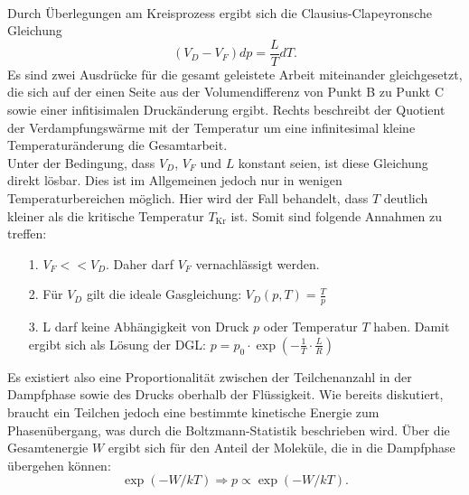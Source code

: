 \\
Durch Überlegungen am Kreisprozess ergibt sich die Clausius-Clapeyronsche Gleichung 
\begin{equation}
    (V_D-V_F)dp=\frac{L}{T}dT.
\end{equation}
Es sind zwei Ausdrücke für die gesamt geleistete Arbeit miteinander gleichgesetzt, 
die sich auf der einen Seite aus der Volumendifferenz von Punkt B zu Punkt C sowie einer infitisimalen
Druckänderung ergibt.
Rechts beschreibt der Quotient der Verdampfungswärme mit der Temperatur um eine infinitesimal kleine
Temperaturänderung die Gesamtarbeit.\\
Unter der Bedingung, dass $V_D$, $V_F$ und $L$ konstant seien, ist diese Gleichung direkt lösbar. Dies ist im
Allgemeinen jedoch nur in wenigen Temperaturbereichen möglich. Hier wird der Fall behandelt, dass $T$ deutlich kleiner
als die kritische Temperatur $T_\text{Kr}$ ist.
\newpage
Somit sind folgende Annahmen zu treffen:
\begin{itemize}
    \item[1.] $V_F<<V_D$. Daher darf $V_F$ vernachlässigt werden.
    \item[2.] Für $V_D$ gilt die ideale Gasgleichung: $V_D(p,T)=\frac{T}{p}$
    \item[3.] L darf keine Abhängigkeit von Druck $p$ oder Temperatur $T$ haben. Damit
    ergibt sich als Lösung der DGL: $p=p_0\cdot \exp(-\frac{1}{T}\cdot\frac{L}{R})$
\end{itemize}
Es existiert also eine Proportionalität zwischen der Teilchenanzahl in der Dampfphase sowie
des Drucks oberhalb der Flüssigkeit. Wie bereits diskutiert, braucht ein Teilchen jedoch eine bestimmte
kinetische Energie zum Phasenübergang, was durch die Boltzmann-Statistik beschrieben wird.
Über die Gesamtenergie $W$ ergibt sich für den Anteil der Moleküle, die in die Dampfphase übergehen können:
\begin{equation*}
\exp(-W/kT)\Rightarrow p\propto \exp(-W/kT).
\end{equation*}